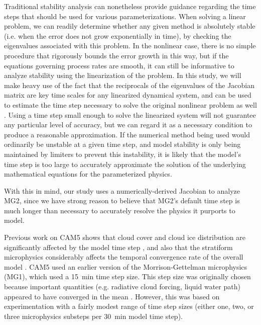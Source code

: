 \documentclass [11pt, proquest] {uwthesis}[2020/02/24]
\begin{document}
Traditional stability analysis can nonetheless provide guidance regarding the time steps that should be used for various parameterizations. When solving a linear problem, we can readily determine whether any given method is absolutely stable (i.e. when the error does not grow exponentially in time), by checking the eigenvalues associated with this problem. In the nonlinear case, there is no simple procedure that rigorously bounds the error growth in this way, but if the equations governing process rates are smooth, it can still be informative to analyze stability using the linearization of the problem. In this study, we will make heavy use of the fact that the reciprocals of the eigenvalues of the Jacobian matrix are key time scales for any linearized dynamical system, and can be used to estimate the time step necessary to solve the original nonlinear problem as well \parencite{RJL-FDM}. Using a time step small enough to solve the linearized system will not guarantee any particular level of accuracy, but we can regard it as a necessary condition to produce a reasonable approximation. If the numerical method being used would ordinarily be unstable at a given time step, and model stability is only being maintained by limiters to prevent this instability, it is likely that the model's time step is too large to accurately approximate the solution of the underlying mathematical equations for the parameterized physics.

With this in mind, our study uses a numerically-derived Jacobian to analyze MG2, since we have strong reason to believe that MG2's default time step is much longer than necessary to accurately resolve the physics it purports to model.

Previous work on CAM5 shows that cloud cover and cloud ice distribution are significantly affected by the model time step \parencite{Wan2014}, and also that the stratiform microphysics considerably affects the temporal convergence rate of the overall model \parencite{Wan2015}. CAM5 used an earlier version of the Morrison-Gettelman microphysics (MG1), which used a \SI{15}{\minute} time step size. This step size was originally chosen because important quantities (e.g. radiative cloud forcing, liquid water path) appeared to have converged in the mean \parencite{Gettelman2008}. However, this was based on experimentation with a fairly modest range of time step sizes (either one, two, or three microphysics substeps per \SI{30}{\minute} model time step).
\end{document}
